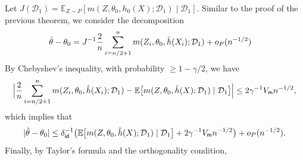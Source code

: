 \documentclass{article}
\def\gD{{\mathcal{D}}}
\newcommand{\E}{\mathbb{E}}
\begin{document}
Let $J(\gD_1) = \E_{Z\sim P}[m(Z,\theta_0,h_0(X);\gD_1) \mid \gD_1]$. Similar to the proof of the previous theorem, we consider the decomposition
\begin{equation}
    \notag
    \begin{aligned}
        \hat{\theta}-\theta_0 &= J^{-1}\frac{2}{n}\sum_{i=n/2+1}^n m(Z_i,\theta_0,\hat{h}(X_i);\gD_1) + o_P(n^{-1/2})
    \end{aligned}
\end{equation}
By Chebyshev's inequality, with probability $\geq 1-\gamma/2$, we have
\begin{equation}
    \notag
    \Big|\frac{2}{n}\sum_{i=n/2+1}^n m(Z_i,\theta_0,\hat{h}(X_i);\gD_1) - \E\big[m(Z,\theta_0,\hat{h}(X);\gD_1)\mid \gD_1\big]\Big| \leq 2\gamma^{-1} V_{\mathsf{m}} n^{-1/2},
\end{equation}
which implies that
\begin{equation}
    \notag
    |\hat{\theta}-\theta_0| \leq \delta_{\mathsf{id}}^{-1} \big( \E\big[m(Z,\theta_0,\hat{h}(X);\gD_1)\mid \gD_1\big] + 2\gamma^{-1} V_{\mathsf{m}}n^{-1/2}\big) + o_P(n^{-1/2}).
\end{equation}
Finally, by Taylor's formula and the orthogonality condition,
\end{document}
